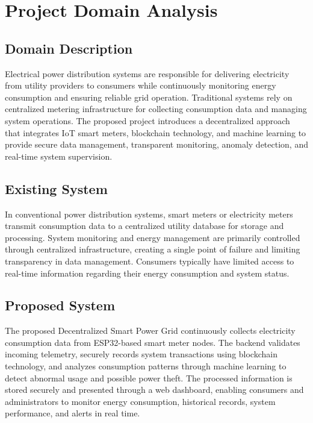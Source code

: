 \clearpage
\section{Project Domain Analysis}

\subsection{Domain Description}

Electrical power distribution systems are responsible for delivering
electricity from utility providers to consumers while continuously
monitoring energy consumption and ensuring reliable grid operation.
Traditional systems rely on centralized metering infrastructure for
collecting consumption data and managing system operations. The proposed
project introduces a decentralized approach that integrates IoT smart
meters, blockchain technology, and machine learning to provide secure
data management, transparent monitoring, anomaly detection, and
real-time system supervision.

\subsection{Existing System}

In conventional power distribution systems, smart meters or electricity
meters transmit consumption data to a centralized utility database for
storage and processing. System monitoring and energy management are
primarily controlled through centralized infrastructure, creating a
single point of failure and limiting transparency in data management.
Consumers typically have limited access to real-time information
regarding their energy consumption and system status.

\subsection{Proposed System}

The proposed Decentralized Smart Power Grid continuously collects
electricity consumption data from ESP32-based smart meter nodes. The
backend validates incoming telemetry, securely records system
transactions using blockchain technology, and analyzes consumption
patterns through machine learning to detect abnormal usage and possible
power theft. The processed information is stored securely and presented
through a web dashboard, enabling consumers and administrators to
monitor energy consumption, historical records, system performance, and
alerts in real time.